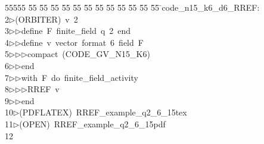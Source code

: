 %
%
\begin{tabbing}
55555 \= 55 \= 55 \= 55 \= 55 \= 55 \= 55 \= 55 \= 55 \= 55 \= 55 \= 55 \= 55 \= \>code\_n15\_k6\_d6\_RREF:\\[0pt]
2\>$\triangleright$\>(ORBITER)\ v\ 2\ \\[0pt]
3\>$\triangleright$\>$\triangleright$\>define\ F\ finite\_field\ q\ 2\ end\ \\[0pt]
4\>$\triangleright$\>$\triangleright$\>define\ v\ vector\ format\ 6\ field\ F\ \\[0pt]
5\>$\triangleright$\>$\triangleright$\>$\triangleright$\>compact\ (CODE\_GV\_N15\_K6)\ \\[0pt]
6\>$\triangleright$\>$\triangleright$\>end\ \\[0pt]
7\>$\triangleright$\>$\triangleright$\>with\ F\ do\ finite\_field\_activity\ \\[0pt]
8\>$\triangleright$\>$\triangleright$\>$\triangleright$\>RREF\ v\ \\[0pt]
9\>$\triangleright$\>$\triangleright$\>end\\[0pt]
10\>$\triangleright$\>(PDFLATEX)\ RREF\_example\_q2\_6\_15tex\\[0pt]
11\>$\triangleright$\>(OPEN)\ RREF\_example\_q2\_6\_15pdf\\[0pt]
12\>\end{tabbing}
